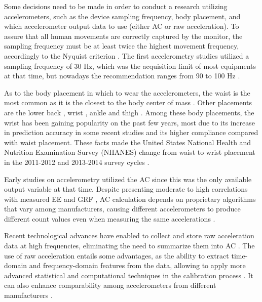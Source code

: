 \documentclass[12pt]{article}
\begin{document}
Some decisions need to be made in order to conduct a research utilizing accelerometers, such as the device sampling frequency, body placement, and which accelerometer output data to use (either AC or raw acceleration). To assure that all human movements are correctly captured by the monitor, the sampling frequency must be at least twice the highest movement frequency, accordingly to the Nyquist criterion . The first accelerometry studies utilized a sampling frequency of 30 Hz, which was the acquisition limit of most equipments at that time, but nowadays the recommendation ranges from 90 to 100 Hz .

As to the body placement in which to wear the accelerometers, the waist is the most common as it is the closest to the body center of mass . Other placements are the lower back , wrist , ankle  and thigh . Among these body placements, the wrist has been gaining popularity on the past few years, most due to its increase in prediction accuracy in some recent studies  and its higher compliance compared with waist placement. These facts made the United States National Health and Nutrition Examination Survey (NHANES) change from waist to wrist placement in the 2011-2012 and 2013-2014 survey cycles .

Early studies on accelerometry utilized the AC since this was the only available output variable at that time. Despite presenting moderate to high correlations with measured EE  and GRF , AC calculation depends on proprietary algorithms that vary among manufacturers, causing different accelerometers to produce different count values even when measuring the same accelerations .

Recent technological advances have enabled to collect and store raw acceleration data at high frequencies, eliminating the need to summarize them into AC . The use of raw acceleration entails some advantages, as the ability to extract time-domain and frequency-domain features from the data, allowing to apply more advanced statistical and computational techniques in the calibration process . It can also enhance comparability among accelerometers from different manufacturers .
\end{document}
